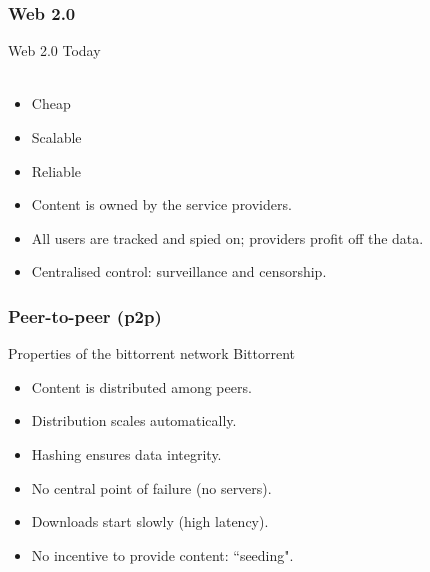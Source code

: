 \documentclass{beamer}
\begin{document}
\subsubsection{Web 2.0}
\begin{frame}{Web 2.0}
 Today\\[5pt]
 \\
 \begin{itemize}
  \item<3-> Cheap  
  \item<6-> Scalable
  \item<7-> Reliable
 \end{itemize}
 \begin{itemize}
  \item<9-> Content is \alert<9>{owned by the service providers}.
  \item<10-> All users are \alert<10>{tracked and spied on}; providers profit off the data.
  \item<11-> Centralised control: \alert<11>{surveillance and censorship}.
 \end{itemize}
\pause
\end{frame}


\subsubsection{Peer-to-peer (p2p)}
\begin{frame}{Properties of the bittorrent network}
 Bittorrent\\
 \begin{itemize}
  \item<2-> Content is distributed among peers.
  \item<3-> Distribution scales automatically.
  \item<4-> Hashing ensures data integrity.
  \item<5-> No central point of failure (no servers).
 \end{itemize}
 \begin{itemize}
  \item<6-> Downloads start slowly (high latency).
  \item<7-> No incentive to provide content: ``seeding".
 \end{itemize}
\end{frame}
\end{document}
